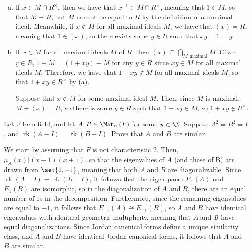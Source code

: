 \documentclass[10pt]{mypackage}
\begin{document}
\begin{solution}\hfill
  \begin{enumerate}[(a)]
    \item If $x\in M\cap R^{\times}$, then we have that $x^{-1}\in M\cap R^{\times}$, meaning that $1\in M$, so that $M = R$, but $M$ cannot be equal to $R$ by the definition of a maximal ideal. Meanwhile, if $x\notin M$ for all maximal ideals $M$, we have that $\left( x \right) = R$, meaning that $1\in \left( x \right)$, so there exists some $y\in R$ such that $ xy = 1 = yx$.
    \item If $x\in M$ for all maximal ideals $M$ of $R$, then $\left( x \right) \subseteq \bigcap_{M\text{ maximal}}M$. Given $y\in R$, $1 + M = \left( 1 + xy \right) + M$ for any $y\in R$ since $xy\in M$ for all maximal ideals $M$. Therefore, we have that $1 + xy\notin M$ for all maximal ideals $M$, so that $1 + xy\in R^{\times}$ by (a).

      Suppose that $x\notin M$ for some maximal ideal $M$. Then, since $M$ is maximal, $M + \left( x \right) = R$, so there is some $y\in R$ such that $1 + xy\in M$, so $1 + xy\notin R^{\times}$.
  \end{enumerate}
\end{solution}
\begin{problem}[Problem 5]
  Let $F$ be a field, and let $A,B\in \Mat_n\left( F \right)$ for some $n\in \N$. Suppose $A^2 = B^2 = I$, and $\operatorname{rk}\left( A-I \right) = \operatorname{rk}\left( B-I \right)$. Prove that $A$ and $B$ are similar.
\end{problem}
\begin{solution}
  We start by assuming that $F$ is not characteristic $2$. Then, $\mu_A(x) | \left( x-1 \right)\left( x+1 \right)$, so that the eigenvalues of $A$ (and those of B) are drawn from $\set{1,-1}$, meaning that both $A$ and $B$ are diagonalizable. Since $\operatorname{rk}\left( A- I\right) = \operatorname{rk}\left( B-I \right)$, it follows that the eigenspaces $E_{1}(A)$ and $E_{1}(B)$ are isomorphic, so in the diagonalization of $A$ and $B$, there are an equal number of $1$s in the decomposition. Furthermore, since the remaining eigenvalues are equal to $-1$, it follows that $E_{-1}(A)\cong E_{-1}(B)$, so $A$ and $B$ have identical eigenvalues with identical geometric multiplicity, meaning that $A$ and $B$ have equal diagonalizations. Since Jordan canonical forms define a unique similarity class, and $A$ and $B$ have identical Jordan canonical forms, it follows that $A$ and $B$ are similar.
\end{solution}
\end{document}
